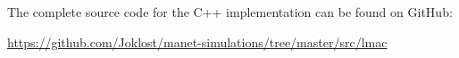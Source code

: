 



The complete source code for the C++ implementation can be found on GitHub:

{\small \url{https://github.com/Joklost/manet-simulations/tree/master/src/lmac}}


